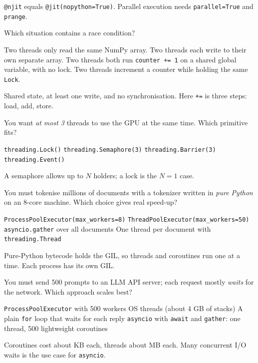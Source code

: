 \documentclass[addpoints,11pt]{exam}
\newcommand{\q}{\Needspace{7\baselineskip}\question}
\begin{document}
\begin{questions}
\begin{choices}
\end{choices}
\begin{solution}\texttt{@njit} equals \texttt{@jit(nopython=True)}. Parallel execution needs \texttt{parallel=True} and \texttt{prange}.\end{solution}

\q[4]
Which situation contains a race condition?
\begin{choices}
  \choice Two threads only read the same NumPy array.
  \choice Two threads each write to their own separate array.
  \CorrectChoice Two threads both run \texttt{counter += 1} on a shared global variable, with no lock.
  \choice Two threads increment a counter while holding the same \texttt{Lock}.
\end{choices}
\begin{solution}Shared state, at least one write, and no synchronisation. Here \texttt{+=} is three steps: load, add, store.\end{solution}

\q[4]
You want \emph{at most 3} threads to use the GPU at the same time. Which primitive fits?
\begin{choices}
  \choice \texttt{threading.Lock()}
  \CorrectChoice \texttt{threading.Semaphore(3)}
  \choice \texttt{threading.Barrier(3)}
  \choice \texttt{threading.Event()}
\end{choices}
\begin{solution}A semaphore allows up to $N$ holders; a lock is the $N=1$ case.\end{solution}

\q[4]
You must tokenise millions of documents with a tokenizer written in \emph{pure Python} on an 8-core
machine. Which choice gives real speed-up?
\begin{choices}
  \CorrectChoice \texttt{ProcessPoolExecutor(max\_workers=8)}
  \choice \texttt{ThreadPoolExecutor(max\_workers=50)}
  \choice \texttt{asyncio.gather} over all documents
  \choice One thread per document with \texttt{threading.Thread}
\end{choices}
\begin{solution}Pure-Python bytecode holds the GIL, so threads and coroutines run one at a time. Each process has its own GIL.\end{solution}

\q[4]
You must send 500 prompts to an LLM API server; each request mostly \emph{waits} for the network.
Which approach scales best?
\begin{choices}
  \choice \texttt{ProcessPoolExecutor} with 500 workers
   OS threads (about 4 GB of stacks)
  \choice A plain \texttt{for} loop that waits for each reply
  \CorrectChoice \texttt{asyncio} with \texttt{await} and \texttt{gather}: one thread, 500 lightweight coroutines
\end{choices}
\begin{solution}Coroutines cost about KB each, threads about MB each. Many concurrent I/O waits is the use case for \texttt{asyncio}.\end{solution}


\end{questions}
\end{document}
